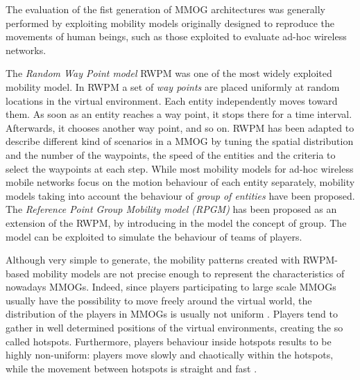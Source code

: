\documentclass[final,10pt,a5paper]{phdimt}
\theoremstyle{definition}
\begin{document}
The evaluation of the fist generation of  MMOG architectures was generally performed by exploiting mobility models originally designed to reproduce the movements of human beings, such as those exploited to evaluate ad-hoc wireless networks.


The {\em Random Way Point model} RWPM \cite{Hong1999} was one of the most widely exploited mobility model.
In RWPM a set of {\em way points} are placed uniformly at random locations in the virtual environment.
Each entity independently moves toward them.  As soon as an entity reaches a way point, it stops there for a time interval. 
Afterwards, it chooses another way point, and so on. 
RWPM has been adapted to describe different kind of scenarios in a MMOG by tuning the spatial distribution and the number of the waypoints, the speed of the entities and the criteria to select the waypoints at each step.
While most mobility models for ad-hoc wireless mobile networks focus on the  motion behaviour of each entity separately, mobility models taking into account the behaviour of {\em group of entities} have been proposed.
The {\em Reference Point Group Mobility model (RPGM)} \cite{Hong1999} has been proposed as an extension of the RWPM, by 
introducing in the model the concept of group. The model can be exploited to simulate the behaviour of teams of players.

Although very simple to generate, the mobility patterns created with RWPM-based mobility models are not precise enough 
to represent the characteristics of nowadays MMOGs.
Indeed, since players participating to large scale MMOGs usually have the possibility to move freely around the virtual world, the distribution of the players in MMOGs is usually not uniform \cite{La2008}.
Players tend to gather in well determined positions of the virtual environments, creating the so called hotspots.
Furthermore, players behaviour inside hotspots results to be highly non-uniform: players move slowly and chaotically within the hotspots, while the movement between hotspots is straight and fast \cite{Liang2008}.
\end{document}
